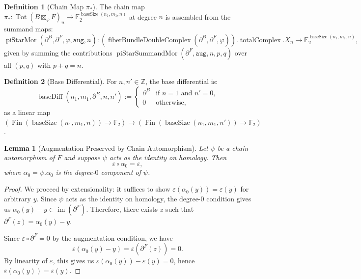 \documentclass[11pt]{article}
\theoremstyle{plain}
\newtheorem*{lemma}{Lemma}
\theoremstyle{definition}
\newtheorem*{definition}{Definition}
\theoremstyle{remark}
\begin{document}
\begin{definition}[Chain Map $\pi_*$]
The chain map $\pi_* : \operatorname{Tot}(B \boxtimes_\varphi F)_n \to \mathbb{F}_2^{\operatorname{baseSize}(n_1,m_1,n)}$ at degree $n$ is assembled from the summand maps:
\[
\operatorname{piStarMor}(\partial^B, \partial^F, \varphi, \mathtt{aug}, n) :
(\operatorname{fiberBundleDoubleComplex}(\partial^B, \partial^F, \varphi)).\operatorname{totalComplex}.X_n
\longrightarrow
\mathbb{F}_2^{\operatorname{baseSize}(n_1,m_1,n)},
\]
given by summing the contributions $\operatorname{piStarSummandMor}(\partial^F, \mathtt{aug}, n, p, q)$ over all $(p, q)$ with $p + q = n$.
\end{definition}

\begin{definition}[Base Differential]
For $n, n' \in \mathbb{Z}$, the base differential is:
\[
\operatorname{baseDiff}(n_1, m_1, \partial^B, n, n') :=
\begin{cases}
\partial^B & \text{if } n = 1 \text{ and } n' = 0,\\
0 & \text{otherwise,}
\end{cases}
\]
as a linear map $(\operatorname{Fin}(\operatorname{baseSize}(n_1,m_1,n)) \to \mathbb{F}_2) \to (\operatorname{Fin}(\operatorname{baseSize}(n_1,m_1,n')) \to \mathbb{F}_2)$.
\end{definition}

\begin{lemma}[Augmentation Preserved by Chain Automorphism]
Let $\psi$ be a chain automorphism of $F$ and suppose $\psi$ acts as the identity on homology. Then
\[
\varepsilon \circ \alpha_0 = \varepsilon,
\]
where $\alpha_0 = \psi.\alpha_0$ is the degree-$0$ component of $\psi$.
\end{lemma}

\begin{proof}
We proceed by extensionality: it suffices to show $\varepsilon(\alpha_0(y)) = \varepsilon(y)$ for arbitrary $y$. Since $\psi$ acts as the identity on homology, the degree-$0$ condition gives us $\alpha_0(y) - y \in \operatorname{im}(\partial^F)$. Therefore, there exists $z$ such that $\partial^F(z) = \alpha_0(y) - y$.

Since $\varepsilon \circ \partial^F = 0$ by the augmentation condition, we have
\[
\varepsilon(\alpha_0(y) - y) = \varepsilon(\partial^F(z)) = 0.
\]
By linearity of $\varepsilon$, this gives us $\varepsilon(\alpha_0(y)) - \varepsilon(y) = 0$, hence $\varepsilon(\alpha_0(y)) = \varepsilon(y)$.
\end{proof}
\end{document}
